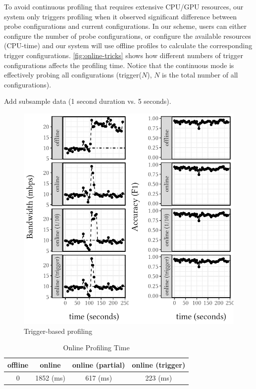  To avoid continuous profiling that requires
extensive CPU/GPU resources, our system only triggers profiling when it observed
significant difference between probe configurations and current
configurations. In our scheme, users can either configure the number of probe
configurations, or configure the available resources (CPU-time) and our system
will use offline profiles to calculate the corresponding trigger configurations.
\autoref{fig:online-tricks} shows how different numbers of trigger
configurations affects the profiling time. Notice that the continuous mode is
effectively probing all configurations (trigger($N$), $N$ is the total number of
all configurations).

Add subsample data (1 second duration vs. 5 seconds).


\begin{figure}
  \centering
  \includegraphics[width=\columnwidth]{figures/online-profiling.pdf}
  \caption{Trigger-based profiling}
  \label{fig:online-tricks}
\end{figure}

\begin{table}
  \centering
  \begin{tabular}{c|c|c|c}
    \hline
    offline & online & online (partial) & online (trigger) \\
    \hline
    0       & 1852 (ms)   & 617 (ms)              & 223 (ms) \\
    \hline
  \end{tabular}
  \caption{Online Profiling Time}
  \label{tab:online}
\end{table}

